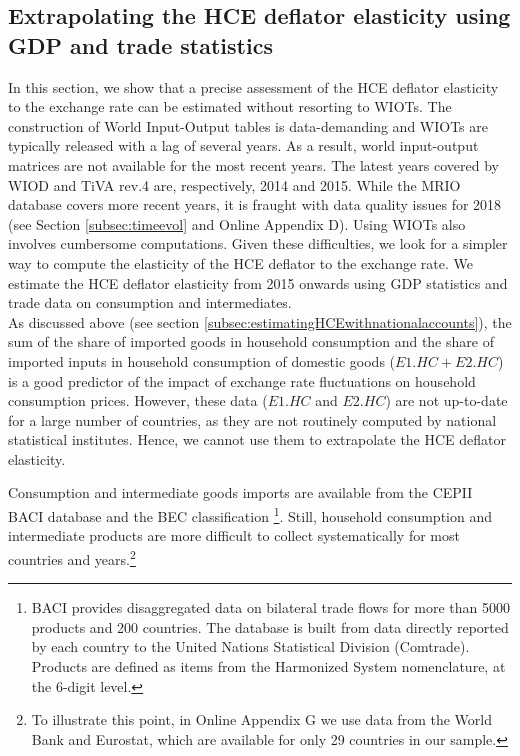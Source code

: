\documentclass[11pt,a4paper]{paper} %
\begin{document}
\subsection{Extrapolating the HCE deflator elasticity using GDP and trade statistics}\label{sec:Extrapolations}
In this section, we show that a precise assessment of the HCE deflator elasticity to the exchange rate can be estimated without resorting to WIOTs. 
The construction of World Input-Output tables is data-demanding and WIOTs are typically released with a lag of several years.
As a result, world input-output matrices are not available for the most recent years.
The latest years covered by WIOD and TiVA rev.4 are, respectively, 2014 and 2015. 
While the MRIO database covers more recent years, it is fraught with data quality issues for 2018 (see Section \ref{subsec:timeevol} and Online Appendix D).
Using WIOTs also involves cumbersome computations.
Given these difficulties, we look for a simpler way to compute the elasticity of the HCE deflator to the exchange rate.
We estimate the HCE deflator elasticity from 2015 onwards using GDP statistics and trade data on consumption and intermediates.\\
As discussed above (see section \ref{subsec:estimatingHCEwithnationalaccounts}), the sum of the share of imported goods in household consumption and the share of imported inputs in household consumption of domestic goods ($E1.HC + E2.HC$) is a good predictor of the impact of exchange rate fluctuations on household consumption prices. 
However, these data ($E1.HC$ and $E2.HC$) are not up-to-date for a large number of countries, as they are not routinely computed by national statistical institutes.
Hence, we cannot use them to extrapolate the HCE deflator elasticity.

Consumption and intermediate goods imports are available from the CEPII BACI database and the BEC classification \citep{Gaulier2010}\footnote{BACI provides disaggregated data on bilateral trade flows for more than 5000 products and 200 countries. The database is built from data directly reported by each country to the United Nations Statistical Division (Comtrade). Products are defined as items from the Harmonized System nomenclature, at the 6-digit level.}.
Still, household consumption and intermediate products are more difficult to collect systematically for most countries and years.\footnote{To illustrate this point, in Online Appendix G we use data from the World Bank and Eurostat, which are available for only 29 countries in our sample.}
\end{document}
